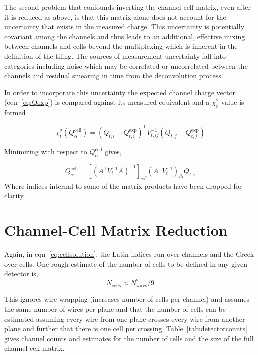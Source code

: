\documentclass[letter]{article}
\def\mQdec{Q_{t,i}}
\def\mQexp{Q^{\mathrm{exp}}_{t,i}}
\def\mVcov{V_{t,ij}}
\def\mQcell{Q^{\mathrm{cell}}_\alpha}
\def\Qcell{$\mQcell$\xspace}
\begin{document}
The second problem that confounds inverting the channel-cell matrix,
even after it is reduced as above, is that this matrix alone does not
account for the uncertainty that exists in the measured charge.
This uncertainty is potentially covariant among the channels and thus
leads to an additional, effective mixing between channels and cells
beyond the multiplexing which is inherent in the definition of the
tiling.
The sources of measurement uncertainty fall into categories including
noise which may be correlated or uncorrelated between the channels and
residual smearing in time from the deconvolution process.

In order to incorporate this uncertainty the expected channel charge
vector (eqn~\ref{eq:Qexp}) is compared against its measured equivalent and 
a $\chi^2_t$ value is formed

\begin{equation}
  \label{eq:chi2}
  \chi^2_t(\mQcell) = (\mQdec - \mQexp)^\mathsf{T}\mVcov^{-1}(Q_{t,j} - Q^{\mathrm{exp}}_{t,j})
\end{equation}

\noindent Minimizing with respect to \Qcell gives,

\begin{equation}
  \label{eq:cellsolution}
  \mQcell = [(A^\mathsf{T}V_t^{-1}A)^{-1}]_{\alpha\beta}
  (A^\mathsf{T}V_t^{-1})_{\beta i}\mQdec
\end{equation}
Where indices internal to some of the matrix products have been
dropped for clarity.

\section{Channel-Cell Matrix Reduction}
\label{sec:reduction}

Again, in eqn~\ref{eq:cellsolution}, the Latin indices run over
channels and the Greek over cells.
One rough estimate of the number of cells to be defined in any given
detector is,
\begin{equation}
  \label{eq:ncellsestimate}
  N_\mathrm{cells} \approx N_\mathrm{wires}^2/9
\end{equation}

This ignores wire wrapping (increases number of cells per channel) and
assumes the same number of wires per plane and that the number of
cells can be estimated assuming every wire from one plane crosses
every wire from another plane and further that there is one cell per
crossing.
Table~\ref{tab:detectorcounts} gives channel counts and estimates for the
number of cells and the size of the full channel-cell matrix.
\end{document}

